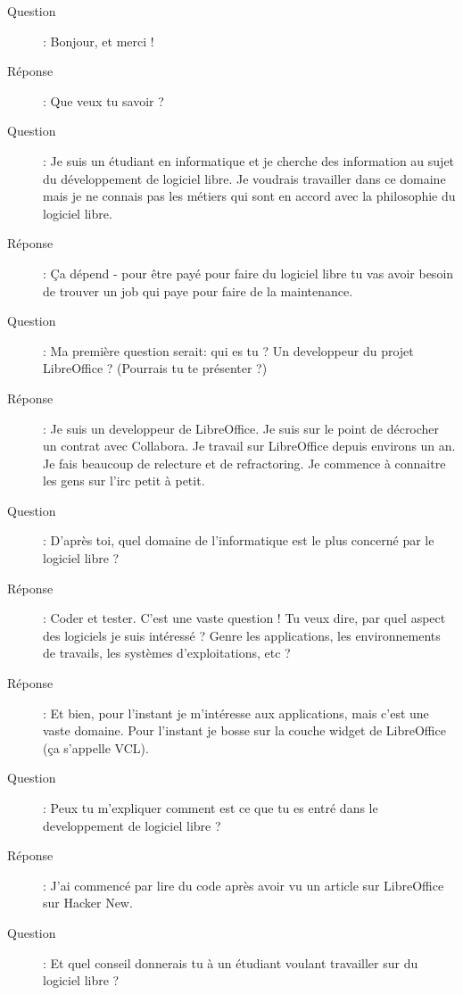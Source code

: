 \documentclass[a4paper,12pt, draft]{report}
\begin{document}
\begin{description}
\item [Question]:  Bonjour, et merci !
\item [Réponse]:  Que veux tu savoir ?
\item [Question]:  Je suis un étudiant en informatique et je cherche des information au sujet du développement de logiciel libre. Je voudrais travailler dans ce domaine mais je ne connais pas les métiers qui sont en accord avec la philosophie du logiciel libre.
\item [Réponse]:  Ça dépend - pour être payé pour faire du logiciel libre tu vas avoir besoin de trouver un job qui paye pour faire de la maintenance.
\item [Question]:  Ma première question serait: qui es tu ? Un developpeur du projet LibreOffice ? (Pourrais tu te présenter ?)
\item [Réponse]:  Je suis un developpeur de LibreOffice. Je suis sur le point de décrocher un contrat avec Collabora. Je travail sur LibreOffice depuis environs un an. Je fais beaucoup de relecture et de refractoring. Je commence à connaitre les gens sur l'irc petit à petit.
\item [Question]:  D'après toi, quel domaine de l'informatique est le plus concerné par le logiciel libre ?
\item [Réponse]:  Coder et tester. C'est une vaste question ! Tu veux dire, par quel aspect des logiciels je suis intéressé ? Genre les applications, les environnements de travails, les systèmes d'exploitations, etc ?
\item [Réponse]:  Et bien, pour l'instant je m'intéresse aux applications, mais c'est une vaste domaine. Pour l'instant je bosse sur la couche widget de LibreOffice (ça s'appelle VCL).
\item [Question]: Peux tu m'expliquer comment est ce que tu es entré dans le developpement de logiciel libre ?
\item [Réponse]:  J'ai commencé par lire du code après avoir vu un article sur LibreOffice sur Hacker New.
\item [Question]:  Et quel conseil donnerais tu à un étudiant voulant travailler sur du logiciel libre ?

\end{description}
\end{document}
